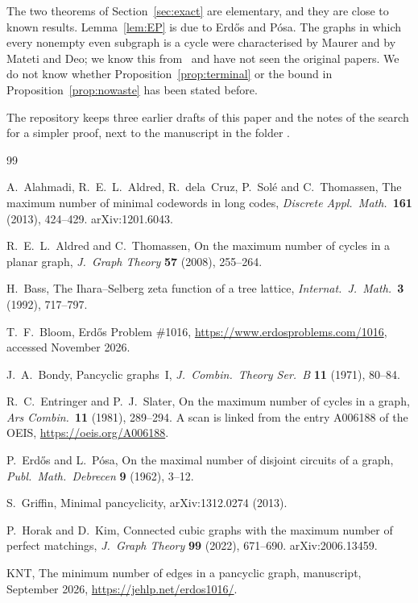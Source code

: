 \documentclass[11pt]{article}
\theoremstyle{definition}
\theoremstyle{remark}
\numberwithin{equation}{section}
\begin{document}
The two theorems of Section~\ref{sec:exact} are elementary, and they are close to known results.
Lemma~\ref{lem:EP} is due to Erd\H{o}s and P\'osa. The graphs in which every nonempty even subgraph
is a cycle were characterised by Maurer and by Mateti and Deo; we know this
from~\cite[Theorem~1]{ES} and have not seen the original papers. We do not know whether
Proposition~\ref{prop:terminal} or the bound in Proposition~\ref{prop:nowaste} has been stated
before.

The repository keeps three earlier drafts of this paper and the notes of the search for a simpler
proof, next to the manuscript in the folder .

\begin{thebibliography}{99}\small

 A.~Alahmadi, R.~E.~L.~Aldred, R.~dela~Cruz, P.~Sol\'e and C.~Thomassen, The maximum
number of minimal codewords in long codes, \emph{Discrete Appl.\ Math.}\ \textbf{161} (2013),
424--429. arXiv:1201.6043.

 R.~E.~L.~Aldred and C.~Thomassen, On the maximum number of cycles in a planar graph,
\emph{J.~Graph Theory} \textbf{57} (2008), 255--264.

 H.~Bass, The Ihara--Selberg zeta function of a tree lattice, \emph{Internat.\
J.~Math.}\ \textbf{3} (1992), 717--797.

 T.~F.~Bloom, Erd\H{o}s Problem \#1016, \url{https://www.erdosproblems.com/1016},
accessed November 2026.

 J.~A.~Bondy, Pancyclic graphs~I, \emph{J.~Combin.\ Theory Ser.~B} \textbf{11}
(1971), 80--84.

 R.~C.~Entringer and P.~J.~Slater, On the maximum number of cycles in a graph,
\emph{Ars Combin.}\ \textbf{11} (1981), 289--294. A scan is linked from the entry A006188 of the
OEIS, \url{https://oeis.org/A006188}.

 P.~Erd\H{o}s and L.~P\'osa, On the maximal number of disjoint circuits of a graph,
\emph{Publ.\ Math.\ Debrecen} \textbf{9} (1962), 3--12.

 S.~Griffin, Minimal pancyclicity, arXiv:1312.0274 (2013).

 P.~Horak and D.~Kim, Connected cubic graphs with the maximum number of perfect
matchings, \emph{J.~Graph Theory} \textbf{99} (2022), 671--690. arXiv:2006.13459.

 KNT, The minimum number of edges in a pancyclic graph, manuscript, September 2026,
\url{https://jehlp.net/erdos1016/}.


\end{thebibliography}
\end{document}
